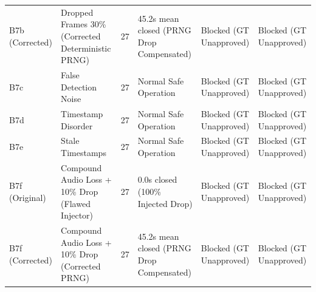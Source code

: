 \begin{table}[t]
\begin{tabular}{llllll}
B7b (Corrected) & Dropped Frames 30\% (Corrected Deterministic PRNG) & 27 & 45.2s mean closed (PRNG Drop Compensated) & Blocked (GT Unapproved) & Blocked (GT Unapproved) \\
B7c & False Detection Noise & 27 & Normal Safe Operation & Blocked (GT Unapproved) & Blocked (GT Unapproved) \\
B7d & Timestamp Disorder & 27 & Normal Safe Operation & Blocked (GT Unapproved) & Blocked (GT Unapproved) \\
B7e & Stale Timestamps & 27 & Normal Safe Operation & Blocked (GT Unapproved) & Blocked (GT Unapproved) \\
B7f (Original) & Compound Audio Loss + 10\% Drop (Flawed Injector) & 27 & 0.0s closed (100\% Injected Drop) & Blocked (GT Unapproved) & Blocked (GT Unapproved) \\
B7f (Corrected) & Compound Audio Loss + 10\% Drop (Corrected PRNG) & 27 & 45.2s mean closed (PRNG Drop Compensated) & Blocked (GT Unapproved) & Blocked (GT Unapproved) \\
\hline
\end{tabular}
\end{table}

